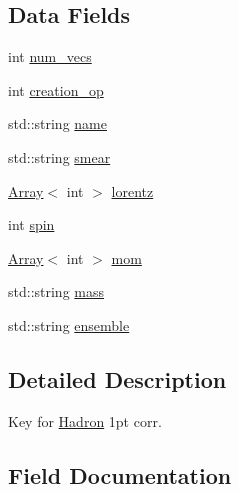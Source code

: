 \subsection*{Data Fields}
\begin{DoxyCompactItemize}
\item 
int \mbox{\hyperlink{structFF_1_1KeyHadron1PtCorr__t_a5e81867fc8679cb4bcb3ccd1d692aaae}{num\+\_\+vecs}}
\item 
int \mbox{\hyperlink{structFF_1_1KeyHadron1PtCorr__t_aaa5b94770e7829265d2880d322b55e79}{creation\+\_\+op}}
\item 
std\+::string \mbox{\hyperlink{structFF_1_1KeyHadron1PtCorr__t_a3ff8e0ef11e909111b1f14dec98c998c}{name}}
\item 
std\+::string \mbox{\hyperlink{structFF_1_1KeyHadron1PtCorr__t_a5c9abbb9bf30a9fdf94af2e297efbcbd}{smear}}
\item 
\mbox{\hyperlink{classXMLArray_1_1Array}{Array}}$<$ int $>$ \mbox{\hyperlink{structFF_1_1KeyHadron1PtCorr__t_add1c7c3202141fb4c70959a11c28c4a8}{lorentz}}
\item 
int \mbox{\hyperlink{structFF_1_1KeyHadron1PtCorr__t_a316f2a29938d549d19e4040aab49780f}{spin}}
\item 
\mbox{\hyperlink{classXMLArray_1_1Array}{Array}}$<$ int $>$ \mbox{\hyperlink{structFF_1_1KeyHadron1PtCorr__t_aea16c1e8351981453f7561cf8067a238}{mom}}
\item 
std\+::string \mbox{\hyperlink{structFF_1_1KeyHadron1PtCorr__t_a978b5291fa99c170e8c4860233de2acc}{mass}}
\item 
std\+::string \mbox{\hyperlink{structFF_1_1KeyHadron1PtCorr__t_a75e7d93e488da1645e138bfc5ab14ad0}{ensemble}}
\end{DoxyCompactItemize}


\subsection{Detailed Description}
Key for \mbox{\hyperlink{namespaceHadron}{Hadron}} 1pt corr. 

\subsection{Field Documentation}
\mbox{\label{structFF_1_1KeyHadron1PtCorr__t_aaa5b94770e7829265d2880d322b55e79}} 
